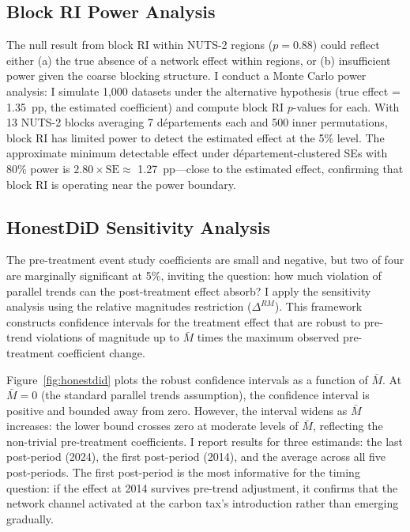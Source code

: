 \documentclass[12pt]{article}
\newcommand{\dept}{d\'{e}partement}
\newcommand{\depts}{d\'{e}partements}
\begin{document}
\subsection{Block RI Power Analysis}
\label{sec:block_power}

The null result from block RI within NUTS-2 regions ($p = 0.88$) could reflect either (a) the true absence of a network effect within regions, or (b) insufficient power given the coarse blocking structure. I conduct a Monte Carlo power analysis: I simulate 1,000 datasets under the alternative hypothesis (true effect = 1.35~pp, the estimated coefficient) and compute block RI $p$-values for each. With 13 NUTS-2 blocks averaging 7 \depts{} each and 500 inner permutations, block RI has limited power to detect the estimated effect at the 5\% level. The approximate minimum detectable effect under \dept{}-clustered SEs with 80\% power is $2.80 \times \text{SE} \approx$ 1.27~pp---close to the estimated effect, confirming that block RI is operating near the power boundary.

\subsection{HonestDiD Sensitivity Analysis}
\label{sec:honestdid}

The pre-treatment event study coefficients are small and negative, but two of four are marginally significant at 5\%, inviting the question: how much violation of parallel trends can the post-treatment effect absorb? I apply the \citet{rambachan2023more} sensitivity analysis using the relative magnitudes restriction ($\Delta^{RM}$). This framework constructs confidence intervals for the treatment effect that are robust to pre-trend violations of magnitude up to $\bar{M}$ times the maximum observed pre-treatment coefficient change.

Figure~\ref{fig:honestdid} plots the robust confidence intervals as a function of $\bar{M}$. At $\bar{M} = 0$ (the standard parallel trends assumption), the confidence interval is positive and bounded away from zero. However, the interval widens as $\bar{M}$ increases: the lower bound crosses zero at moderate levels of $\bar{M}$, reflecting the non-trivial pre-treatment coefficients. I report results for three estimands: the last post-period (2024), the first post-period (2014), and the average across all five post-periods. The first post-period is the most informative for the timing question: if the effect at 2014 survives pre-trend adjustment, it confirms that the network channel activated at the carbon tax's introduction rather than emerging gradually.
\end{document}
